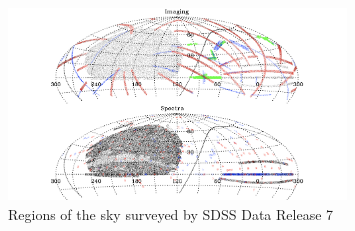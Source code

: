 \begin{figure}[hbtp]
  \centering
  \includegraphics[width=0.8\textwidth]{SDSS_OFF}
  \caption{Regions of the sky surveyed by SDSS Data Release 7 \cite{2009ApJS..182..543A}}
  \label{3}
\end{figure}

